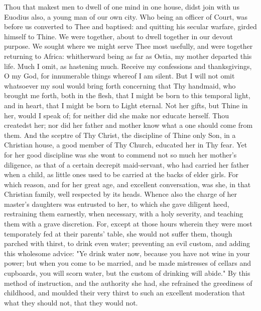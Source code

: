 \documentclass[b5paper,openright,12pt,twoside]{book}
\begin{document}
Thou that makest men to dwell of one mind in one house, didst join with
us Euodius also, a young man of our own city. Who being an officer of
Court, was before us converted to Thee and baptised: and quitting his
secular warfare, girded himself to Thine. We were together, about to
dwell together in our devout purpose. We sought where we might serve
Thee most usefully, and were together returning to Africa: whitherward
being as far as Ostia, my mother departed this life. Much I omit, as
hastening much. Receive my confessions and thanksgivings, O my God, for
innumerable things whereof I am silent. But I will not omit whatsoever
my soul would bring forth concerning that Thy handmaid, who brought me
forth, both in the flesh, that I might be born to this temporal light,
and in heart, that I might be born to Light eternal. Not her gifts, but
Thine in her, would I speak of; for neither did she make nor educate
herself. Thou createdst her; nor did her father and mother know what a
one should come from them. And the sceptre of Thy Christ, the discipline
of Thine only Son, in a Christian house, a good member of Thy Church,
educated her in Thy fear. Yet for her good discipline was she wont
to commend not so much her mother's diligence, as that of a certain
decrepit maid-servant, who had carried her father when a child, as
little ones used to be carried at the backs of elder girls. For which
reason, and for her great age, and excellent conversation, was she,
in that Christian family, well respected by its heads. Whence also the
charge of her master's daughters was entrusted to her, to which she gave
diligent heed, restraining them earnestly, when necessary, with a holy
severity, and teaching them with a grave discretion. For, except at
those hours wherein they were most temporately fed at their parents'
table, she would not suffer them, though parched with thirst, to drink
even water; preventing an evil custom, and adding this wholesome advice:
"Ye drink water now, because you have not wine in your power; but when
you come to be married, and be made mistresses of cellars and cupboards,
you will scorn water, but the custom of drinking will abide." By this
method of instruction, and the authority she had, she refrained the
greediness of childhood, and moulded their very thirst to such an
excellent moderation that what they should not, that they would not.
\end{document}
